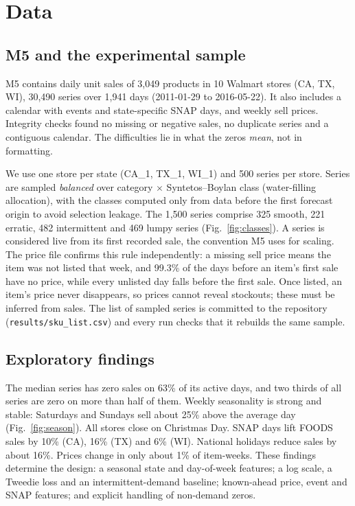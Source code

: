 \documentclass[conference]{IEEEtran}
\begin{document}
\section{Data}
\label{sec:data}
\subsection{M5 and the experimental sample}
M5 contains daily unit sales of 3{,}049 products in 10 Walmart stores (CA, TX, WI), 30{,}490 series over 1{,}941 days (2011-01-29 to 2016-05-22). It also includes a calendar with events and state-specific SNAP days, and weekly sell prices. Integrity checks found no missing or negative sales, no duplicate series and a contiguous calendar. The difficulties lie in what the zeros \emph{mean}, not in formatting.

We use one store per state (CA\_1, TX\_1, WI\_1) and 500 series per store. Series are sampled \emph{balanced} over category $\times$ Syntetos--Boylan class (water-filling allocation), with the classes computed only from data before the first forecast origin to avoid selection leakage. The 1{,}500 series comprise 325 smooth, 221 erratic, 482 intermittent and 469 lumpy series (Fig.~\ref{fig:classes}). A series is considered live from its first recorded sale, the convention M5 uses for scaling. The price file confirms this rule independently: a missing sell price means the item was not listed that week, and 99.3\% of the days before an item's first sale have no price, while every unlisted day falls before the first sale. Once listed, an item's price never disappears, so prices cannot reveal stockouts; these must be inferred from sales. The list of sampled series is committed to the repository (\texttt{results/sku\_list.csv}) and every run checks that it rebuilds the same sample.

\subsection{Exploratory findings}
The median series has zero sales on 63\% of its active days, and two thirds of all series are zero on more than half of them. Weekly seasonality is strong and stable: Saturdays and Sundays sell about 25\% above the average day (Fig.~\ref{fig:season}). All stores close on Christmas Day. SNAP days lift FOODS sales by 10\% (CA), 16\% (TX) and 6\% (WI). National holidays reduce sales by about 16\%. Prices change in only about 1\% of item-weeks. These findings determine the design: a seasonal state and day-of-week features; a log scale, a Tweedie loss and an intermittent-demand baseline; known-ahead price, event and SNAP features; and explicit handling of non-demand zeros.
\end{document}
